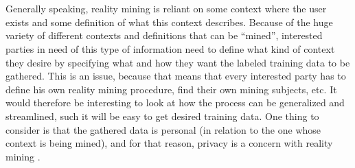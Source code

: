 \\\\
Generally speaking, reality mining is reliant on some context where the user exists and some definition of what this context describes. Because of the huge variety of different contexts and definitions that can be ``mined'', interested parties in need of this type of information need to define what kind of context they desire by specifying what and how they want the labeled training data to be gathered. This is an issue, because that means that every interested party has to define his own reality mining procedure, find their own mining subjects, etc. It would therefore be interesting to look at how the process can be generalized and streamlined, such it will be easy to get desired training data. One thing to consider is that the gathered data is personal (in relation to the one whose context is being mined), and for that reason, privacy is a concern with reality mining \parencite{madan2009_reality_mining_privacy}.

